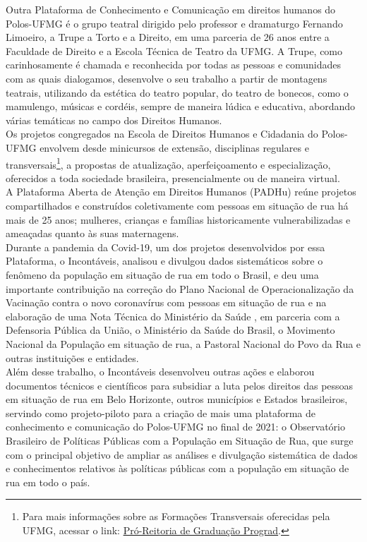 \documentclass[14pt]{extarticle}
\begin{document}
Outra Plataforma de Conhecimento e Comunicação em direitos humanos do Polos-UFMG é o grupo teatral dirigido pelo professor e dramaturgo Fernando Limoeiro, a Trupe a Torto e a Direito, em uma parceria de 26 anos entre a Faculdade de Direito e a Escola Técnica de Teatro da UFMG. A Trupe, como carinhosamente é chamada e reconhecida por todas as pessoas e comunidades com as quais dialogamos, desenvolve o seu trabalho a partir de montagens teatrais, utilizando da estética do teatro popular, do teatro de bonecos, como o mamulengo, músicas e cordéis, sempre de maneira lúdica e educativa, abordando várias temáticas no campo dos Direitos Humanos.\\

Os projetos congregados na Escola de Direitos Humanos e Cidadania do Polos-UFMG envolvem desde minicursos de extensão, disciplinas regulares e transversais\footnote{Para mais informações sobre as Formações Transversais oferecidas pela UFMG, acessar o link: \href{https://www.ufmg.br/prograd/formacao-transversal/}{Pró-Reitoria de Graduação Prograd}.}, a propostas de atualização, aperfeiçoamento e especialização, oferecidos a toda sociedade brasileira, presencialmente ou de maneira virtual.\\

A Plataforma Aberta de Atenção em Direitos Humanos (PADHu) reúne projetos compartilhados e construídos coletivamente com pessoas em situação de rua há mais de 25 anos; mulheres, crianças e famílias historicamente vulnerabilizadas e ameaçadas quanto às suas maternagens.\\

Durante a pandemia da Covid-19, um dos projetos desenvolvidos por essa Plataforma, o Incontáveis, analisou e divulgou dados sistemáticos sobre o fenômeno da população em situação de rua em todo o Brasil, e deu uma importante contribuição na correção do Plano Nacional de Operacionalização da Vacinação contra o novo coronavírus com pessoas em situação de rua  e na elaboração de uma Nota Técnica do Ministério da Saúde , em parceria com a Defensoria Pública da União, o Ministério da Saúde do Brasil, o Movimento Nacional da População em situação de rua, a Pastoral Nacional do Povo da Rua e outras instituições e entidades.\\  

Além desse trabalho, o Incontáveis desenvolveu outras ações e elaborou documentos técnicos e científicos para subsidiar a luta pelos direitos das pessoas em situação de rua em Belo Horizonte, outros municípios e Estados brasileiros, servindo como projeto-piloto para a criação de mais uma plataforma de conhecimento e comunicação do Polos-UFMG no final de 2021: o Observatório Brasileiro de Políticas Públicas com a População em Situação de Rua, que surge com o principal objetivo de ampliar as análises e divulgação sistemática de dados e conhecimentos relativos às políticas públicas com a  população em situação de rua em todo o país. 
\end{document}
